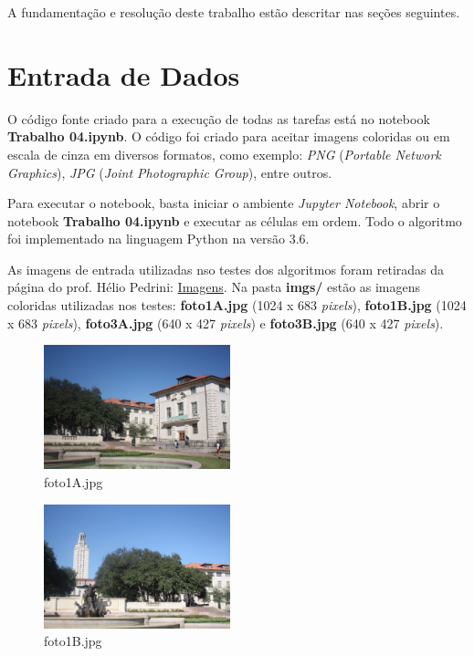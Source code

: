 \documentclass[twoside,twocolumn]{article}
\begin{document}
A fundamentação e resolução deste trabalho estão descritar nas seções seguintes.


\section{Entrada de Dados}

O código fonte criado para a execução de todas as tarefas está no notebook \textbf{Trabalho 04.ipynb}. O código foi criado para aceitar imagens coloridas ou em escala de cinza em diversos formatos, como exemplo: \textit{PNG} (\textit{Portable Network Graphics}), \textit{JPG} (\textit{Joint Photographic Group}), entre outros.

Para executar o notebook, basta iniciar o ambiente \textit{Jupyter Notebook}, abrir o notebook \textbf{Trabalho 04.ipynb} e executar as células em ordem. Todo o algoritmo foi implementado na linguagem Python na versão 3.6.

As imagens de entrada utilizadas nso testes dos algoritmos foram retiradas da página do prof. Hélio Pedrini: \href{http://www.ic.unicamp.br/~helio/imagens_registro/}{Imagens}. Na pasta \textbf{imgs/} estão as imagens coloridas utilizadas nos testes: \textbf{foto1A.jpg} (1024 x 683 \textit{pixels}), \textbf{foto1B.jpg} (1024 x 683 \textit{pixels}), \textbf{foto3A.jpg} (640 x 427 \textit{pixels}) e \textbf{foto3B.jpg} (640 x 427 \textit{pixels}).

\begin{figure}[H]
\begin{center}
	\includegraphics[height=3.6cm]{figures/foto1A.jpg}
\caption{foto1A.jpg} \label{foto1A}
\end{center}
\end{figure}

\begin{figure}[H]
\begin{center}
	\includegraphics[height=3.6cm]{figures/foto1B.jpg}
\caption{foto1B.jpg} \label{foto1B}
\end{center}
\end{figure}
\end{document}
